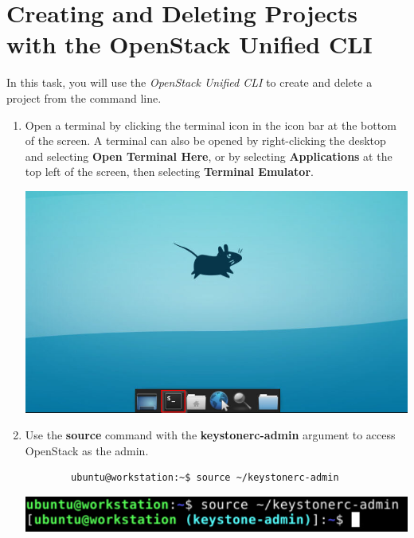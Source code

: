 \documentclass[letterpaper, 12pt]{article}
\begin{document}
\section{Creating and Deleting Projects with the OpenStack Unified CLI}
\label{sec:create_and_delete_projects_using_the_openstack_unified_cli}
In this task, you will use the \textit{OpenStack Unified CLI} to create and delete a project from the command line.

\begin{enumerate}
    \item Open a terminal by clicking the terminal icon in the icon bar at the bottom of the screen.
    A terminal can also be opened by right-clicking the desktop and selecting \textbf{Open Terminal Here}, or by selecting \textbf{Applications} at the top left of the screen, then selecting \textbf{Terminal Emulator}.

    \begin{center}
        \includegraphics[width=\linewidth]{images/part2/step1.png}
    \end{center}

    \item Use the \textbf{source} command with the \textbf{keystonerc-admin} argument to access OpenStack as the admin.
    \begin{lstlisting}
        ubuntu@workstation:~$ source ~/keystonerc-admin
    \end{lstlisting}

    \begin{center}
        \includegraphics[width=\linewidth]{images/part2/step2.png}
    \end{center}


\end{enumerate}
\end{document}
